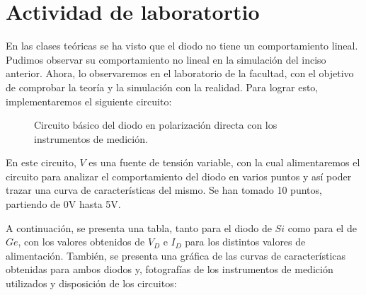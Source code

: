 \documentclass[chaptersright]{informeutn}
\begin{document}
  \section{Actividad de laboratortio}
    En las clases teóricas se ha visto que el diodo no tiene un comportamiento lineal. Pudimos observar su 
    comportamiento no lineal en la simulación del inciso anterior. Ahora, lo observaremos en el laboratorio de la
    facultad, con el objetivo de comprobar la teoría y la simulación con la realidad. Para lograr esto, implementaremos
    el siguiente circuito:

    \begin{figure}[H]
        \centering
        \caption{\footnotesize
        Circuito básico del diodo en polarización directa con los instrumentos de medición.}
    \end{figure}

    En este circuito, $V$ es una fuente de tensión variable, con la cual alimentaremos el circuito para analizar el 
    comportamiento del diodo en varios puntos y así poder trazar una curva de características del mismo. Se han tomado
    10 puntos, partiendo de 0V hasta 5V.
    
    A continuación, se presenta una tabla, tanto para el diodo de $Si$ como para el de $Ge$, con los valores obtenidos 
    de $V_D$ e $I_D$ para los distintos valores de alimentación. También, se presenta una gráfica de las curvas de 
    características obtenidas para ambos diodos y, fotografías de los instrumentos de medición utilizados y disposición 
    de los circuitos:
  
\end{document}
